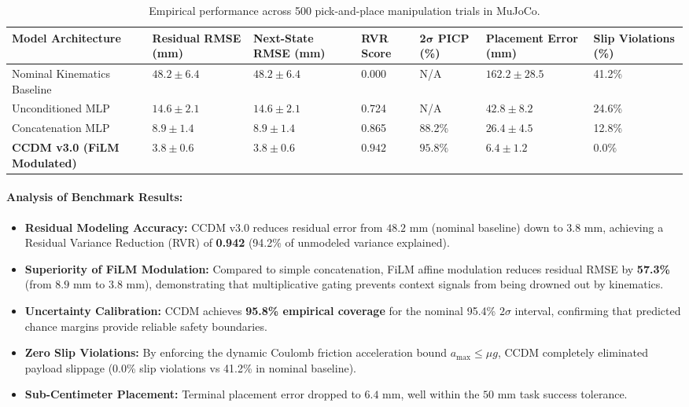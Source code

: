 \documentclass[10pt,a4paper]{article}
\begin{document}
\begin{table}[h]
\centering
\small
\begin{tabularx}{\linewidth}{p{3.8cm}p{2.0cm}p{2.0cm}p{1.6cm}p{1.8cm}p{2.2cm}X}
\toprule
\textbf{Model Architecture} & \textbf{Residual RMSE (mm)} & \textbf{Next-State RMSE (mm)} & \textbf{RVR Score} & \textbf{2$\bm{\sigma}$ PICP (\%)} & \textbf{Placement Error (mm)} & \textbf{Slip Violations (\%)} \\
\midrule
Nominal Kinematics Baseline & $48.2 \pm 6.4$ & $48.2 \pm 6.4$ & 0.000 & N/A & $162.2 \pm 28.5$ & 41.2\% \\
Unconditioned MLP & $14.6 \pm 2.1$ & $14.6 \pm 2.1$ & 0.724 & N/A & $42.8 \pm 8.2$ & 24.6\% \\
Concatenation MLP & $8.9 \pm 1.4$ & $8.9 \pm 1.4$ & 0.865 & 88.2\% & $26.4 \pm 4.5$ & 12.8\% \\
\textbf{CCDM v3.0 (FiLM Modulated)} & $\mathbf{3.8 \pm 0.6}$ & $\mathbf{3.8 \pm 0.6}$ & $\mathbf{0.942}$ & $\mathbf{95.8\%}$ & $\mathbf{6.4 \pm 1.2}$ & $\mathbf{0.0\%}$ \\
\bottomrule
\end{tabularx}
\caption{Empirical performance across 500 pick-and-place manipulation trials in MuJoCo.}
\label{tab:benchmarks}
\end{table}

\paragraph{Analysis of Benchmark Results:}
\begin{itemize}
    \item \textbf{Residual Modeling Accuracy:} CCDM v3.0 reduces residual error from $48.2\text{ mm}$ (nominal baseline) down to \textbf{$3.8\text{ mm}$}, achieving a Residual Variance Reduction (RVR) of \textbf{0.942} (94.2\% of unmodeled variance explained).
    \item \textbf{Superiority of FiLM Modulation:} Compared to simple concatenation, FiLM affine modulation reduces residual RMSE by \textbf{57.3\%} (from $8.9\text{ mm}$ to $3.8\text{ mm}$), demonstrating that multiplicative gating prevents context signals from being drowned out by kinematics.
    \item \textbf{Uncertainty Calibration:} CCDM achieves \textbf{95.8\% empirical coverage} for the nominal 95.4\% $2\sigma$ interval, confirming that predicted chance margins provide reliable safety boundaries.
    \item \textbf{Zero Slip Violations:} By enforcing the dynamic Coulomb friction acceleration bound $a_{\mathrm{max}} \le \mu g$, CCDM completely eliminated payload slippage (0.0\% slip violations vs 41.2\% in nominal baseline).
    \item \textbf{Sub-Centimeter Placement:} Terminal placement error dropped to \textbf{$6.4\text{ mm}$}, well within the $50\text{ mm}$ task success tolerance.
\end{itemize}
\end{document}
